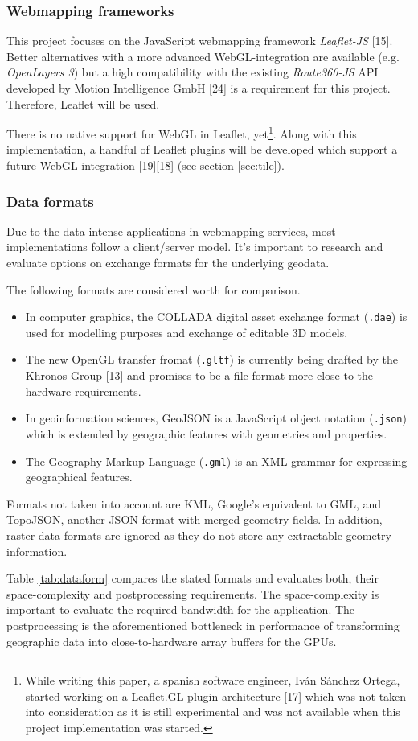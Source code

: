 \documentclass{motivation}
\begin{document}
\subsubsection{Webmapping frameworks}
  This project focuses on the JavaScript webmapping framework \textit{Leaflet-JS} [15]. Better alternatives with a more advanced WebGL-integration are available (e.g. \textit{OpenLayers 3}) but a high compatibility with the existing \textit{Route360-JS} API developed by Motion Intelligence GmbH [24] is a requirement for this project. Therefore, Leaflet will be used.\par
  There is no native support for WebGL in Leaflet, yet\footnote{While writing this paper, a spanish software engineer, Iván Sánchez Ortega, started working on a Leaflet.GL plugin architecture [17] which was not taken into consideration as it is still experimental and was not available when this project implementation was started.}. Along with this implementation, a handful of Leaflet plugins will be developed which support a future WebGL integration [19][18] (see section \ref{sec:tile}).\par

\subsubsection{Data formats}
  Due to the data-intense applications in webmapping services, most implementations follow a client/server model. It's important to research and evaluate options on exchange formats for the underlying geodata.\par
  The following formats are considered worth for comparison.
  \begin{itemize}
  \item In computer graphics, the COLLADA digital asset exchange format (\texttt{.dae}) is used for modelling purposes and exchange of editable 3D models.
  \item The new OpenGL transfer fromat (\texttt{.gltf}) is currently being drafted by the Khronos Group [13] and promises to be a file format more close to the hardware requirements.
  \item In geoinformation sciences, GeoJSON is a JavaScript object notation (\texttt{.json}) which is extended by geographic features with geometries and properties.
  \item The Geography Markup Language (\texttt{.gml}) is an XML grammar for expressing geographical features.
  \end{itemize}
  Formats not taken into account are KML, Google's equivalent to GML, and TopoJSON, another JSON format with merged geometry fields. In addition, raster data formats are ignored as they do not store any extractable geometry information.\par
  Table \ref{tab:dataform} compares the stated formats and evaluates both, their space-complexity and postprocessing requirements. The space-complexity is important to evaluate the required bandwidth for the application. The postprocessing is the aforementioned bottleneck in performance of transforming geographic data into close-to-hardware array buffers for the GPUs.\par
\end{document}
